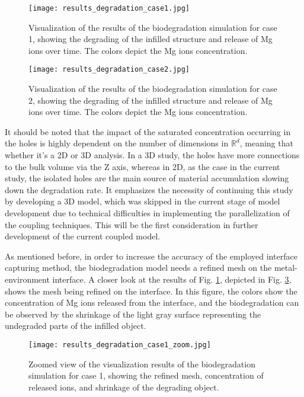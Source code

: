 \begin{figure}[h]
\centering
\medskip
\texttt{[image: results\_degradation\_case1.jpg]}
\caption[Visualization of the results of the biodegradation simulation for case 1]{Visualization of the results of the biodegradation simulation for case 1, showing the degrading of the infilled structure and release of Mg ions over time. The colors depict the Mg ions concentration.} \label{fig:infill_results_degradation_case1}
\end{figure}


\begin{figure}[h]
\centering
\medskip
\texttt{[image: results\_degradation\_case2.jpg]}
\caption[Visualization of the results of the biodegradation simulation for case 2]{Visualization of the results of the biodegradation simulation for case 2, showing the degrading of the infilled structure and release of Mg ions over time. The colors depict the Mg ions concentration.} \label{fig:infill_results_degradation_case2}
\end{figure}

It should be noted that the impact of the saturated concentration occurring in the holes is highly dependent on the number of dimensions in $\mathbb{R}^d$, meaning that whether it's a 2D or 3D analysis. In a 3D study, the holes have more connections to the bulk volume via the Z axis, whereas in 2D, as the case in the current study, the isolated holes are the main source of material accumulation slowing down the degradation rate. It emphasizes the necessity of continuing this study by developing a 3D model, which was skipped in the current stage of model development due to technical difficulties in implementing the parallelization of the coupling techniques. This will be the first consideration in further development of the current coupled model.

As mentioned before, in order to increase the accuracy of the employed interface capturing method, the biodegradation model needs a refined mesh on the metal-environment interface. A closer look at the results of Fig. \ref{fig:infill_results_degradation_case1}, depicted in Fig. \ref{fig:infill_results_degradation_case1_zoom}, shows the mesh being refined on the interface. In this figure, the colors show the concentration of Mg ions released from the interface, and the biodegradation can be observed by the shrinkage of the light gray surface representing the undegraded parts of the infilled object. 


\begin{figure}[h]
\centering
\medskip
\texttt{[image: results\_degradation\_case1\_zoom.jpg]}
\caption[Zoom view of the results of the biodegradation simulation for case 1]{Zoomed view of the visualization results of the biodegradation simulation for case 1, showing the refined mesh, concentration of released ions, and shrinkage of the degrading object.} \label{fig:infill_results_degradation_case1_zoom}
\end{figure}

